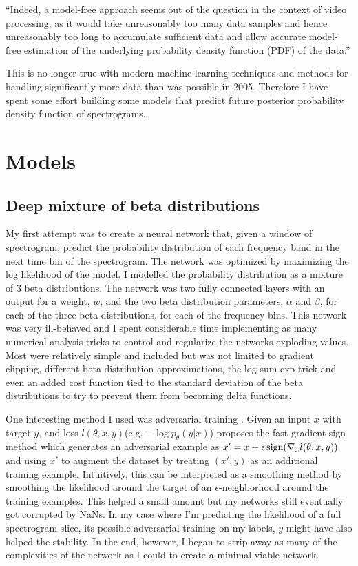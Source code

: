 
``Indeed, a model-free approach seems out of the question in the context of video processing, as it would take unreasonably too many data samples and hence unreasonably too long to accumulate sufficient data and allow accurate model-free estimation of the underlying probability density function (PDF) of the data.''\cite{itti2005principled}

This is no longer true with modern machine learning techniques and methods for handling significantly more data than was possible in 2005. Therefore I have spent some effort building some models that predict future posterior probability density function of spectrograms.

\section{Models}

\subsection{Deep mixture of beta distributions}
My first attempt was to create a neural network that, given a window of spectrogram, predict the probability distribution of each frequency band in the next time bin of the spectrogram. The network was optimized by maximizing the log likelihood of the model. I modelled the probability distribution as a mixture of 3 beta distributions. The network was two fully connected layers with an output for a weight, $w$, and the two beta distribution parameters, $\alpha$ and $\beta$, for each of the three beta distributions, for each of the frequency bins. This network was very ill-behaved and I spent considerable time implementing as many numerical analysis tricks to control and regularize the networks exploding values. Most were relatively simple and included but was not limited to gradient clipping, different beta distribution approximations, the log-sum-exp trick and even an added cost function tied to the standard deviation of the beta distributions to try to prevent them from becoming delta functions.

One interesting method I used was adversarial training \cite{goodfellow2014explaining,lakshminarayanan2017simple}. Given an input $x$ with target $y$, and loss $l(\theta, x, y)$(e.g. $-\log p_\theta(y|x)$) \cite{goodfellow2014explaining} proposes the fast gradient sign method which generates an adversarial example as $x' = x + \epsilon \operatorname{sign}(\nabla_x l(\theta, x, y))$ and using $x'$ to augment the dataset by treating $(x', y)$ as an additional training example. Intuitively, this can be interpreted as a smoothing method by smoothing the likelihood around the target of an $\epsilon$-neighborhood around the training examples. This helped a small amount but my networks still eventually got corrupted by NaNs. In my case where I'm predicting the likelihood of a full spectrogram slice, its possible adversarial training on my labels, $y$ might have also helped the stability. In the end, however, I began to strip away as many of the complexities of the network as I could to create a minimal viable network.


